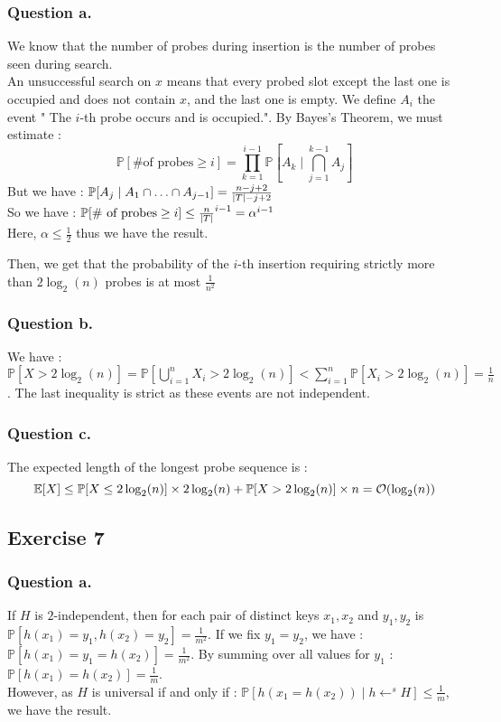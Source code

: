 \documentclass{cours}
\begin{document}
\subsubsection{Question a.}
We know that the number of probes during insertion is the number of probes seen during search.\\
An unsuccessful search on $x$ means that every probed slot except the last one is occupied and does not contain $x$, and the last one is empty.
We define $A_{i}$ the event " The $i$-th probe occurs and is occupied.". By Bayes's Theorem, we must estimate :
\[
    \mathbb{P}[\text{\# of probes} \geq i] = \prod_{k = 1}^{i - 1} \mathbb{P}[A_{k} \mid \bigcap\limits_{j = 1}^{k - 1} A_{j}]
\]
But we have : $\mathbb{P}[A_{j}\mid A_{1} \cap \ldots \cap A_{j - 1}] = \frac{n - j + 2}{\left|T\right| - j + 2}$\\
So we have : $\mathbb{P}[\text{\# of probes} \geq i] \leq \frac{n}{\left|T\right|}^{i - 1} = \alpha^{i - 1}$\\
Here, $\alpha \leq \frac{1}{2}$ thus we have the result.

Then, we get that the probability of the $i$-th insertion requiring strictly more than $2\log_{2}(n)$ probes is at most $\frac{1}{n^{2}}$


\subsubsection{Question b.}
We have : $\mathbb{P}[X > 2\log_{2}(n)] = \mathbb{P}\left[\bigcup_{i=1}^{n}{X_{i} > 2 \log_{2}(n)}\right] < \sum_{i = 1}^{n}\mathbb{P}\left[X_{i} > 2\log_{2}(n)\right] = \frac{1}{n}$.
The last inequality is strict as these events are not independent.

\subsubsection{Question c.}
The expected length of the longest probe sequence is :
\[
    \mathbb{E}[X] \leq \mathbb{P}[X \leq 2\log_{2}(n)]\times 2\log_{2}(n) + \mathbb{P}[X > 2\log_{2}(n)]\times n = \mathcal{O}(\log_{2}(n))
\]

\subsection{Exercise 7}
\subsubsection{Question a.}
If $H$ is $2$-independent, then for each pair of distinct keys $x_{1}, x_{2}$ and $y_{1}, y_{2}$ is $\mathbb{P}[h(x_{1}) = y_{1}, h(x_{2}) = y_{2}] = \frac{1}{m^{2}}$.
If we fix $y_{1} = y_{2}$, we have : $\mathbb{P}[h(x_{1}) =y_{1}= h(x_{2})] = \frac{1}{m^{2}}$. By summing over all values for $y_{1}$ :
$\mathbb{P}[h(x_{1}) = h(x_{2})] = \frac{1}{m}$.\\
However, as $H$ is universal if and only if : $\mathbb{P}[h(x_{1} = h(x_{2}))\mid h \gets^{s} H] \leq \frac{1}{m}$, we have the result.
\end{document}
